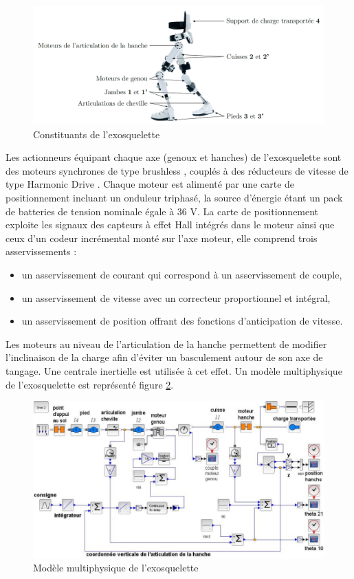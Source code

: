 \begin{figure}[!h]
 \centering\includegraphics[width=0.9\linewidth]{img/fig02}
 \caption{Constituants de l'exosquelette}
 \label{img02}
\end{figure}

Les actionneurs équipant chaque axe (genoux et hanches) de l'exosquelette sont des moteurs synchrones de
type \og brushless \fg, couplés à des réducteurs de vitesse de type \og Harmonic Drive \fg. Chaque moteur est alimenté par une carte de positionnement incluant un onduleur triphasé, la source d'énergie étant un pack de batteries de tension nominale égale à 36 V. La carte de positionnement exploite les signaux des capteurs à effet Hall intégrés dans le moteur ainsi que ceux d'un codeur incrémental monté sur l'axe moteur, elle comprend trois asservissements :
\begin{itemize}
 \item un asservissement de courant qui correspond à un asservissement de couple,
 \item un asservissement de vitesse avec un correcteur proportionnel et intégral,
 \item un asservissement de position offrant des fonctions d'anticipation de vitesse.
\end{itemize}

Les moteurs au niveau de l'articulation de la hanche permettent de modifier l'inclinaison de la charge afin
d'éviter un basculement autour de son axe de tangage. Une centrale inertielle est utilisée à cet effet. Un modèle multiphysique de l'exosquelette est représenté figure \ref{img03}.

\begin{figure}[!h]
 \centering\includegraphics[width=0.9\linewidth]{img/fig03}
 \caption{Modèle multiphysique de l'exosquelette}
 \label{img03}
\end{figure}

